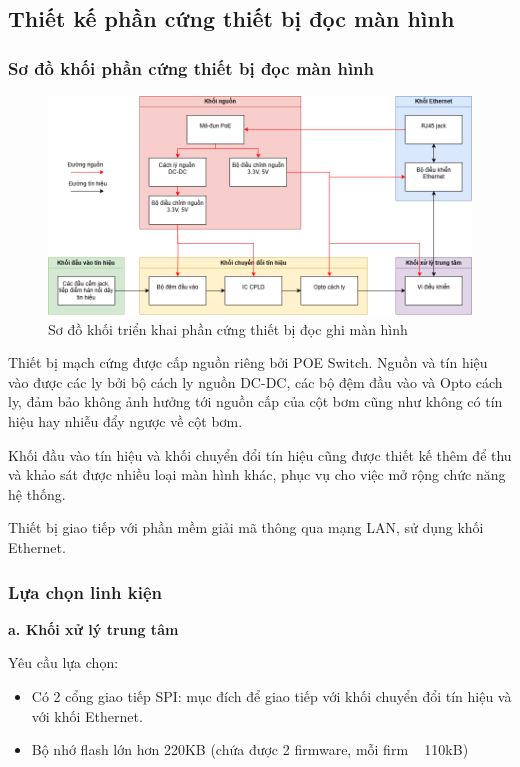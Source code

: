 \subsection{Thiết kế phần cứng thiết bị đọc màn hình}

\subsubsection{Sơ đồ khối phần cứng thiết bị đọc màn hình}


\begin{figure}[!ht]
    \centering
    \includegraphics[width=1.0\linewidth]{Figures/Chap3_Device-Hardware-implementation-function-block.png}
    \caption{Sơ đồ khối triển khai phần cứng thiết bị đọc ghi màn hình}
    \label{fig:hinh3.4}
\end{figure}

Thiết bị mạch cứng được cấp nguồn riêng bởi POE Switch. Nguồn và tín hiệu vào được các ly bởi bộ cách ly nguồn DC-DC, các bộ đệm đầu vào và Opto cách ly, đảm bảo không ảnh hưởng tới nguồn cấp của cột bơm cũng như không có tín hiệu hay nhiễu đẩy ngược về cột bơm.

Khối đầu vào tín hiệu và khối chuyển đổi tín hiệu cũng được thiết kế thêm để thu và khảo sát được nhiều loại màn hình khác, phục vụ cho việc mở rộng chức năng hệ thống.

Thiết bị giao tiếp với phần mềm giải mã thông qua mạng LAN, sử dụng khối Ethernet.

\subsubsection{Lựa chọn linh kiện}

\textbf{a.  Khối xử lý trung tâm}

 Yêu cầu lựa chọn:
\begin{itemize}
    \item Có 2 cổng giao tiếp SPI: mục đích để giao tiếp với khối chuyển đổi tín hiệu và với khối Ethernet. 
    \item Bộ nhớ flash lớn hơn 220KB (chứa được 2 firmware, mỗi firm ~ 110kB)
\end{itemize}

